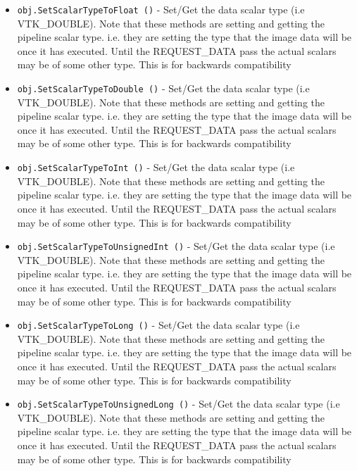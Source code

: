 \begin{itemize}
\item  \verb|obj.SetScalarTypeToFloat ()| -  Set/Get the data scalar type (i.e VTK\_DOUBLE). Note that these methods
 are setting and getting the pipeline scalar type. i.e. they are setting
 the type that the image data will be once it has executed. Until the
 REQUEST\_DATA pass the actual scalars may be of some other type. This is
 for backwards compatibility

\item  \verb|obj.SetScalarTypeToDouble ()| -  Set/Get the data scalar type (i.e VTK\_DOUBLE). Note that these methods
 are setting and getting the pipeline scalar type. i.e. they are setting
 the type that the image data will be once it has executed. Until the
 REQUEST\_DATA pass the actual scalars may be of some other type. This is
 for backwards compatibility

\item  \verb|obj.SetScalarTypeToInt ()| -  Set/Get the data scalar type (i.e VTK\_DOUBLE). Note that these methods
 are setting and getting the pipeline scalar type. i.e. they are setting
 the type that the image data will be once it has executed. Until the
 REQUEST\_DATA pass the actual scalars may be of some other type. This is
 for backwards compatibility

\item  \verb|obj.SetScalarTypeToUnsignedInt ()| -  Set/Get the data scalar type (i.e VTK\_DOUBLE). Note that these methods
 are setting and getting the pipeline scalar type. i.e. they are setting
 the type that the image data will be once it has executed. Until the
 REQUEST\_DATA pass the actual scalars may be of some other type. This is
 for backwards compatibility

\item  \verb|obj.SetScalarTypeToLong ()| -  Set/Get the data scalar type (i.e VTK\_DOUBLE). Note that these methods
 are setting and getting the pipeline scalar type. i.e. they are setting
 the type that the image data will be once it has executed. Until the
 REQUEST\_DATA pass the actual scalars may be of some other type. This is
 for backwards compatibility

\item  \verb|obj.SetScalarTypeToUnsignedLong ()| -  Set/Get the data scalar type (i.e VTK\_DOUBLE). Note that these methods
 are setting and getting the pipeline scalar type. i.e. they are setting
 the type that the image data will be once it has executed. Until the
 REQUEST\_DATA pass the actual scalars may be of some other type. This is
 for backwards compatibility


\end{itemize}
